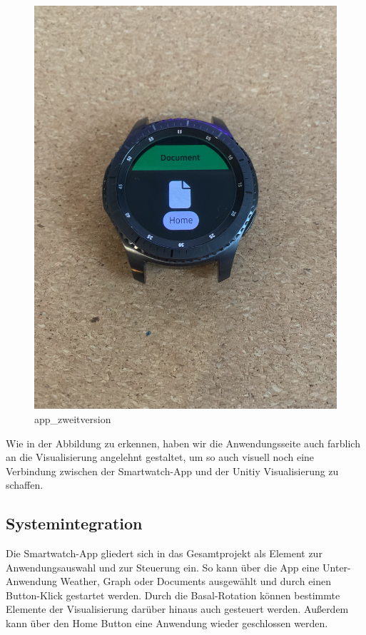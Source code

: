 \documentclass[12pt, a4paper]{article}
\begin{document}
\begin{figure}[h]
	\centering
	\includegraphics[scale=.35]{assets/smartwatch_app_zweitversion.jpg}
	\caption{app_zweitversion}
	\label{fig:Finale Documents Anwendung}
\end{figure}

Wie in der Abbildung zu erkennen, haben wir die Anwendungsseite auch farblich an die Visualisierung angelehnt gestaltet, um so auch visuell noch eine Verbindung zwischen der Smartwatch-App und der Unitiy Visualisierung zu schaffen. 

\subsection{Systemintegration}

Die Smartwatch-App gliedert sich in das Gesamtprojekt als Element zur Anwendungsauswahl und zur Steuerung ein. So kann über die App eine Unter-Anwendung Weather, Graph oder Documents ausgewählt und durch einen Button-Klick gestartet werden. Durch die Basal-Rotation können bestimmte Elemente der Visualisierung darüber hinaus auch gesteuert werden. Außerdem kann über den Home Button eine Anwendung wieder geschlossen werden. 
\end{document}
